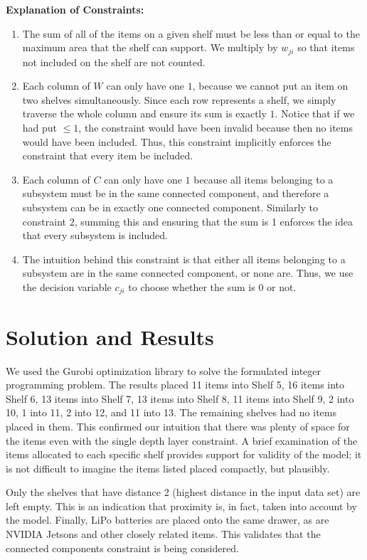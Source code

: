 \documentclass[10pt]{article}
\theoremstyle{named}
\begin{document}
\textbf{Explanation of Constraints:}
\begin{enumerate}
\item The sum of all of the items on a given shelf must be less than or equal to
  the maximum area that the shelf can support. We multiply by $w_{ji}$ so that
  items not included on the shelf are not counted.
\item Each column of $W$ can only have one $1$, because we cannot put an item
  on two shelves simultaneously. Since each row represents a shelf, we simply
  traverse the whole column and ensure its sum is exactly $1$. Notice that if
  we had put $\leq 1$, the constraint would have been invalid because then
  no items would have been included. Thus, this constraint implicitly enforces
  the constraint that every item be included.
\item Each column of $C$ can only have one $1$ because all items belonging to
  a subsystem must be in the same connected component, and therefore a subsystem
  can be in exactly one connected component. Similarly to constraint 2, summing
  this and ensuring that the sum is 1 enforces the idea that every subsystem is
  included.
\item The intuition behind this constraint is that either all items belonging
  to a subsystem are in the same connected component, or none are. Thus, we
  use the decision variable $c_{ji}$ to choose whether the sum is $0$ or not.
\end{enumerate}

\section{Solution and Results}
We used the Gurobi optimization library to solve the formulated integer programming problem. The results placed 11 items into Shelf 5, 16 items into Shelf 6, 13 items into Shelf 7, 13 items into Shelf 8, 11 items into Shelf 9, 2 into 10, 1 into 11, 2 into 12, and 11 into 13. The remaining shelves had no items placed in them. This confirmed our intuition that there was plenty of space for the items even with the single depth layer constraint. A brief examination of the items allocated to each specific shelf provides support for validity of the model; it is not difficult to imagine the items listed placed compactly, but plausibly.
\par
Only the shelves that have distance 2 (highest distance in the input data set) are left empty. This is an indication that proximity is, in fact, taken into account by the model. Finally, LiPo batteries are placed onto the same drawer, as are NVIDIA Jetsons and other closely related items. This validates that the connected components constraint is being considered.
\end{document}
